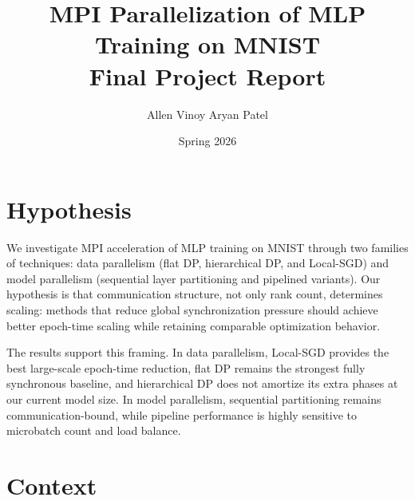 \documentclass[11pt]{article}
\title{
  \textbf{MPI Parallelization of MLP Training on MNIST} \\[1pt]
  \large Final Project Report
}
\author{
  Allen Vinoy \quad Aryan Patel \\[1pt]
}
\date{Spring 2026}
\begin{document}
\maketitle
\vspace{-1.2em}

\noindent{}
\vspace{-1.2em}

\section{Hypothesis}
\label{sec:hypothesis}

We investigate MPI acceleration of MLP training on MNIST through two families
of techniques: data parallelism (flat DP, hierarchical DP, and Local-SGD) and
model parallelism (sequential layer partitioning and pipelined variants). Our
hypothesis is that communication structure, not only rank count, determines
scaling: methods that reduce global synchronization pressure should achieve
better epoch-time scaling while retaining comparable optimization behavior.

The results support this framing. In data parallelism, Local-SGD provides the
best large-scale epoch-time reduction, flat DP remains the strongest fully
synchronous baseline, and hierarchical DP does not amortize its extra phases at
our current model size. In model parallelism, sequential partitioning remains
communication-bound, while pipeline performance is highly sensitive to
microbatch count and load balance.

\section{Context}
\label{sec:context}
\end{document}
